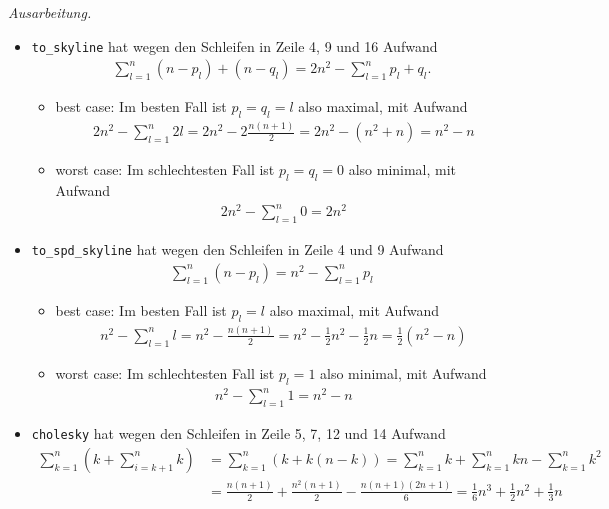 \documentclass[titlepage]{article}
\newenvironment{ausarbeitung}{\vspace{3mm}\noindent\textit{Ausarbeitung.}}{}
\begin{document}
\begin{ausarbeitung}
	
	\begin{itemize}
		\item \texttt{to\_skyline} hat wegen den Schleifen in Zeile 4, 9 und 16 Aufwand
		\begin{align*}
			\sum_{l=1}^{n} (n-p_l)+(n-q_l) = 2n^2-\sum_{l=1}^{n}p_l+q_l.
		\end{align*}
		
		\begin{itemize}
			\item best case: Im besten Fall ist $p_l = q_l = l$ also maximal, mit Aufwand
			\begin{align*}
				2n^2-\sum_{l=1}^{n}2l = 2n^2 - 2\frac{n(n+1)}{2} = 2n^2-(n^2+n) = n^2 - n
			\end{align*}
			
			\item worst case: Im schlechtesten Fall ist $p_l = q_l = 0$ also minimal, mit Aufwand
			\begin{align*}
				2n^2 - \sum_{l=1}^{n}0 = 2n^2
			\end{align*}
		\end{itemize}
		
		\item \texttt{to\_spd\_skyline} hat wegen den Schleifen in Zeile 4 und 9 Aufwand 
		\begin{align*}
			\sum_{l=1}^{n}(n-p_l) = n^2 - \sum_{l=1}^{n}p_l
		\end{align*}
		\begin{itemize}
			\item best case: Im besten Fall ist $p_l = l$ also maximal, mit Aufwand 
			\begin{align*}
				n^2 - \sum_{l=1}^{n}l = n^2 - \frac{n(n+1)}{2} = n^2 - \frac{1}{2}n^2 - \frac{1}{2}n = \frac{1}{2}(n^2-n)
			\end{align*}
			\item worst case: Im schlechtesten Fall ist $p_l=1$ also minimal, mit Aufwand 
			\begin{align*}
				n^2 - \sum_{l=1}^{n}1 = n^2 - n
			\end{align*}
		\end{itemize}
	
		\item \texttt{cholesky} hat wegen den Schleifen in Zeile 5, 7, 12 und 14 Aufwand
		\begin{align*}
			\sum_{k=1}^{n}(k + \sum_{i=k+1}^{n}k) &= \sum_{k=1}^{n}(k+k(n-k)) = \sum_{k=1}^{n}k + \sum_{k=1}^{n}kn - \sum_{k=1}^{n}k^2 \\
			&= \frac{n(n+1)}{2} + \frac{n^2(n+1)}{2} - \frac{n(n+1)(2n+1)}{6} = \frac{1}{6}n^3 + \frac{1}{2}n^2 + \frac{1}{3}n
		\end{align*}
		

\end{itemize}
\end{ausarbeitung}
\end{document}
